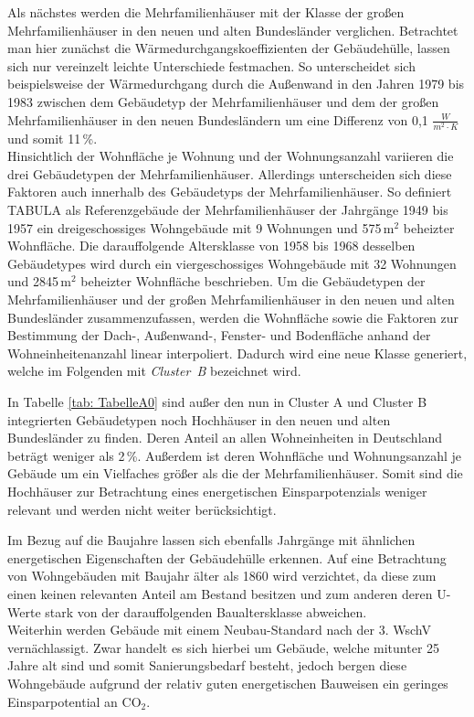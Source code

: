 Als nächstes werden die Mehrfamilienhäuser mit der Klasse der großen Mehrfamilienhäuser in den neuen und alten Bundesländer verglichen.
Betrachtet man hier zunächst die Wärmedurchgangskoeffizienten der Gebäudehülle, lassen sich nur vereinzelt leichte Unterschiede festmachen.
So unterscheidet sich beispielsweise der Wärmedurchgang durch die Außenwand in den Jahren 1979 bis 1983 zwischen dem Gebäudetyp der Mehrfamilienhäuser und dem der großen Mehrfamilienhäuser in den neuen Bundesländern um eine Differenz von 0,1 \(\frac{W}{m^2 \cdot K}\) und somit 11\,\%. \\
Hinsichtlich der Wohnfläche je Wohnung und der Wohnungsanzahl variieren die drei Gebäudetypen der Mehrfamilienhäuser.
Allerdings unterscheiden sich diese Faktoren auch innerhalb des Gebäudetyps der Mehrfamilienhäuser.
So definiert TABULA als Referenzgebäude der Mehrfamilienhäuser der Jahrgänge 1949 bis 1957 ein dreigeschossiges Wohngebäude mit 9 Wohnungen und 575\,m\(^2\) beheizter Wohnfläche. 
Die darauffolgende Altersklasse von 1958 bis 1968 desselben Gebäudetypes wird durch ein viergeschossiges Wohngebäude mit 32 Wohnungen und 2845\,m\(^2\) beheizter Wohnfläche beschrieben.
Um die Gebäudetypen der Mehrfamilienhäuser und der großen Mehrfamilienhäuser in den neuen und alten Bundesländer zusammenzufassen, werden die Wohnfläche sowie die Faktoren zur Bestimmung der Dach-, Außenwand-, Fenster- und Bodenfläche anhand der Wohneinheitenanzahl linear interpoliert.
Dadurch wird eine neue Klasse generiert, welche im Folgenden mit \mbox{\textit{Cluster B}} bezeichnet wird.

In Tabelle \ref{tab: TabelleA0} sind außer den nun in Cluster A und Cluster B integrierten Gebäudetypen noch Hochhäuser in den neuen und alten Bundesländer zu finden.
Deren Anteil an allen Wohneinheiten in Deutschland beträgt weniger als 2\,\%. 
Außerdem ist deren Wohnfläche und Wohnungsanzahl je Gebäude um ein Vielfaches größer als die der Mehrfamilienhäuser.
Somit sind die Hochhäuser zur Betrachtung eines energetischen Einsparpotenzials weniger relevant und werden nicht weiter berücksichtigt.

Im Bezug auf die Baujahre lassen sich ebenfalls Jahrgänge mit ähnlichen energetischen Eigenschaften der Gebäudehülle erkennen.
Auf eine Betrachtung von Wohngebäuden mit Baujahr älter als 1860 wird verzichtet, da diese zum einen keinen relevanten Anteil am Bestand besitzen und zum anderen deren U-Werte stark von der darauffolgenden Baualtersklasse abweichen.\\
Weiterhin werden Gebäude mit einem Neubau-Standard nach der 3. WschV vernächlassigt.
Zwar handelt es sich hierbei um Gebäude, welche mitunter 25 Jahre alt sind und somit Sanierungsbedarf besteht, jedoch bergen diese Wohngebäude aufgrund der relativ guten energetischen Bauweisen ein geringes Einsparpotential an CO\(_2\).

